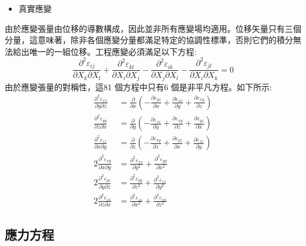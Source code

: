 \begin{itemize}
\item 真實應變
\end{itemize}

由於應變張量由位移的導數構成，因此並非所有應變場均適用。位移矢量只有三個分量，這意味著，除非各個應變分量都滿足特定的協調性標準，否則它們的積分無法給出唯一的一組位移。工程應變必須滿足以下方程:\\
$$\frac{\partial^2 \varepsilon_{i j}}{\partial X_k \partial X_l}+\frac{\partial^2 \varepsilon_{k l}}{\partial X_i \partial X_j}-\frac{\partial^2 \varepsilon_{i k}}{\partial X_j \partial X_l}-\frac{\partial^2 \varepsilon_{j l}}{\partial X_i \partial X_k}=0$$
由於應變張量的對稱性，這81 個方程中只有6 個是非平凡方程。如下所示:\
$$
\begin{aligned}
\frac{\partial^2 \varepsilon_{x x}}{\partial y \partial z} & =\frac{\partial}{\partial x}\left(-\frac{\partial \varepsilon_{y z}}{\partial x}+\frac{\partial \varepsilon_{z x}}{\partial y}+\frac{\partial \varepsilon_{x y}}{\partial z}\right) \\
\frac{\partial^2 \varepsilon_{y y}}{\partial z \partial x} & =\frac{\partial}{\partial y}\left(-\frac{\partial \varepsilon_{z x}}{\partial y}+\frac{\partial \varepsilon_{x y}}{\partial z}+\frac{\partial \varepsilon_{y z}}{\partial x}\right) \\
\frac{\partial^2 \varepsilon_{z z}}{\partial x \partial y} & =\frac{\partial}{\partial z}\left(-\frac{\partial \varepsilon_{x y}}{\partial z}+\frac{\partial \varepsilon_{y z}}{\partial x}+\frac{\partial \varepsilon_{z x}}{\partial y}\right) \\
2 \frac{\partial^2 \varepsilon_{x y}}{\partial x \partial y} & =\frac{\partial^2 \varepsilon_{x x}}{\partial y^2}+\frac{\partial^2 \varepsilon_{y y}}{\partial x^2} \\
2 \frac{\partial^2 \varepsilon_{y z}}{\partial y \partial z} & =\frac{\partial^2 \varepsilon_{y y}}{\partial z^2}+\frac{\partial^2 \varepsilon_{z z}}{\partial y^2} \\
2 \frac{\partial^2 \varepsilon_{z x}}{\partial z \partial x} & =\frac{\partial^2 \varepsilon_{z z}}{\partial x^2}+\frac{\partial^2 \varepsilon_{x x}}{\partial z^2}
\end{aligned}
$$

\subsection{應力方程}

